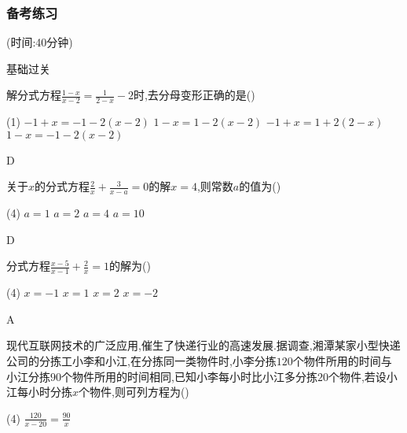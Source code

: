 \documentclass[cn,blue,12pt]{elegantbook}
\begin{document}
\begin{verbatim}
\end{verbatim}

\subsubsection{备考练习}%
(时间:40分钟)
\begin{shiti}
\item 基础过关
    \begin{shiti}
    \item 解分式方程\(\frac{1-x}{x-2}=\frac{1}{2-x}-2\)时,去分母变形正确的是(\qquad)\\
        \begin{tasks}(1)
            \task \(-1+x= -1-2( x - 2)\)
            \task \(1-x = 1-2(x-2)\)
            \task \(-1+x = 1+2(2-x)\)
            \task \(1-x= -1-2(x-2)\)
        \end{tasks}
\begin{solution}
            D
\end{solution}
    \item 关于\(x\)的分式方程\(\frac{2}{x}+\frac{3}{x-a}= 0\)的解\(x=4\),则常数\(a\)的值为(\qquad)\\
        \begin{tasks}(4)
            \task \(  a = 1  \)
            \task \(  a = 2  \)
            \task \(  a = 4  \)
            \task \(  a = 10\)
        \end{tasks}
\begin{solution}
            D
\end{solution}
    \item 分式方程\(\frac{x-5}{x-1} + \frac{2}{x} = 1\)的解为(\qquad)\\
        \begin{tasks}(4)
            \task \(x=-1\)
            \task \(x=1\)
            \task \(x=2\)
            \task \(x=-2\)
        \end{tasks}
\begin{solution}
            A
\end{solution}
    \item 现代互联网技术的广泛应用,催生了快递行业的高速发展.据调查,湘潭某家小型快递公司的分拣工小李和小江,在分拣同一类物件时,小李分拣\(120\)个物件所用的时间与小江分拣\(90\)个物件所用的时间相同,已知小李每小时比小江多分拣\(20\)个物件,若设小江每小时分拣\(x\)个物件,则可列方程为(\qquad)\\
        \begin{tasks}(4)
            \task \(\frac{120}{x-20}=\frac{90}{x}\)

\end{tasks}
\end{shiti}
\end{shiti}
\end{document}
